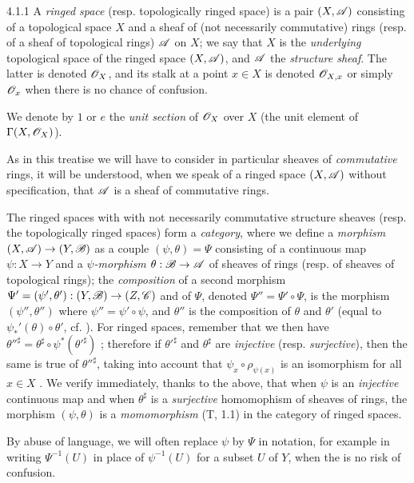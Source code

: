 \begin{env}{4.1.1}
\label{env-0.4.1.1}
A \emph{ringed space} (resp. topologically ringed space) is a pair $(X,\mathscr{A})$
consisting of a topological space $X$ and a sheaf of (not necessarily
commutative) rings (resp. of a sheaf of topological rings) $\mathscr{A}$ on $X$; we
say that $X$ is the \emph{underlying} topological space of the ringed space
$(X,\mathscr{A})$, and $\mathscr{A}$ the \emph{structure sheaf}. The latter is denoted
$\mathscr{O}_X$, and its stalk at a point $x\in X$ is denoted $\mathscr{O}_{X,x}$ or simply
$\mathscr{O}_x$ when there is no chance of confusion.

We denote by $1$ or $e$ the \emph{unit section} of $\mathscr{O}_X$ over $X$ (the unit
element of $\Gamma(X,\mathscr{O}_X)$).

As in this treatise we will have to consider in particular sheaves of
\emph{commutative} rings, it will be understood, when we speak of a ringed space
$(X,\mathscr{A})$ without specification, that $\mathscr{A}$ is a sheaf of commutative
rings.

The ringed spaces with with not necessarily commutative structure sheaves
(resp. the topologically ringed spaces) form a \emph{category}, where we define
a \emph{morphism} $(X,\mathscr{A})\to(Y,\mathscr{B})$ as a couple $(\psi,\theta)=\Psi$
consisting of a continuous map $\psi:X\to Y$ and a \emph{$\psi$-morphism}
$\theta:\mathscr{B}\to\mathscr{A}$  of sheaves of rings (resp. of sheaves
of topological rings); the \emph{composition} of a second morphism
$\Psi'=(\psi',\theta'):(Y,\mathscr{B})\to(Z,\mathscr{C})$ and of $\Psi$, denoted
$\Psi''=\Psi'\circ\Psi$, is the morphism $(\psi'',\theta'')$ where
$\psi''=\psi'\circ\psi$, and $\theta''$ is the composition of $\theta$ and
$\theta'$ (equal to $\psi_*'(\theta)\circ\theta'$, cf. ). For
ringed spaces, remember that we then have
${\theta''}^\sharp=\theta^\sharp\circ\psi^*({\theta'}^\sharp)$
; therefore if ${\theta'}^\sharp$ and $\theta^\sharp$ are
\emph{injective} (resp. \emph{surjective}), then the same is true of
${\theta''}^\sharp$, taking into account that $\psi_x\circ\rho_{\psi(x)}$ is an
isomorphism for all $x\in X$ . We verify immediately, thanks to
the above, that when $\psi$ is an \emph{injective} continuous map and when
$\theta^\sharp$ is a \emph{surjective} homomophism of sheaves of rings, the
morphism $(\psi,\theta)$ is a \emph{momomorphism} (T, 1.1) in the category of
ringed spaces.

By abuse of language, we will often replace $\psi$ by $\Psi$ in notation, for
example in writing $\Psi^{-1}(U)$ in place of $\psi^{-1}(U)$ for a subset $U$ of
$Y$, when the is no risk of confusion.
\end{env}

